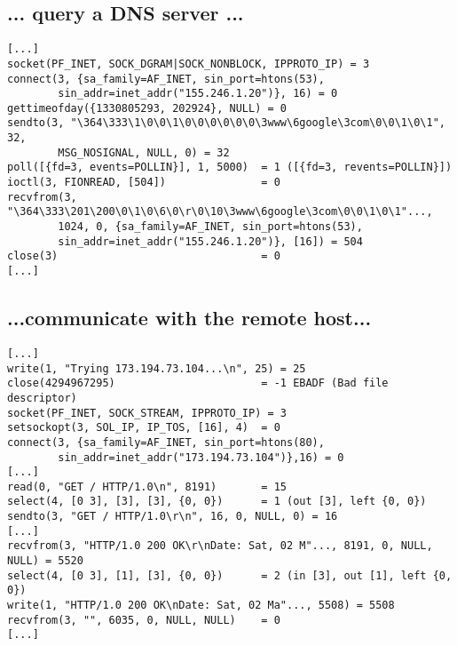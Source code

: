 \documentclass[xga]{xdvislides}
\begin{document}
\subsection{... query a DNS server ...}
\begin{verbatim}
[...]
socket(PF_INET, SOCK_DGRAM|SOCK_NONBLOCK, IPPROTO_IP) = 3
connect(3, {sa_family=AF_INET, sin_port=htons(53),
        sin_addr=inet_addr("155.246.1.20")}, 16) = 0
gettimeofday({1330805293, 202924}, NULL) = 0
sendto(3, "\364\333\1\0\0\1\0\0\0\0\0\0\3www\6google\3com\0\0\1\0\1", 32,
        MSG_NOSIGNAL, NULL, 0) = 32
poll([{fd=3, events=POLLIN}], 1, 5000)  = 1 ([{fd=3, revents=POLLIN}])
ioctl(3, FIONREAD, [504])               = 0
recvfrom(3, "\364\333\201\200\0\1\0\6\0\r\0\10\3www\6google\3com\0\0\1\0\1"...,
        1024, 0, {sa_family=AF_INET, sin_port=htons(53),
        sin_addr=inet_addr("155.246.1.20")}, [16]) = 504
close(3)                                = 0
[...]
\end{verbatim}

\subsection{...communicate with the remote host...}
\begin{verbatim}
[...]
write(1, "Trying 173.194.73.104...\n", 25) = 25
close(4294967295)                       = -1 EBADF (Bad file descriptor)
socket(PF_INET, SOCK_STREAM, IPPROTO_IP) = 3
setsockopt(3, SOL_IP, IP_TOS, [16], 4)  = 0
connect(3, {sa_family=AF_INET, sin_port=htons(80),
        sin_addr=inet_addr("173.194.73.104")},16) = 0
[...]
read(0, "GET / HTTP/1.0\n", 8191)       = 15
select(4, [0 3], [3], [3], {0, 0})      = 1 (out [3], left {0, 0})
sendto(3, "GET / HTTP/1.0\r\n", 16, 0, NULL, 0) = 16
[...]
recvfrom(3, "HTTP/1.0 200 OK\r\nDate: Sat, 02 M"..., 8191, 0, NULL, NULL) = 5520
select(4, [0 3], [1], [3], {0, 0})      = 2 (in [3], out [1], left {0, 0})
write(1, "HTTP/1.0 200 OK\nDate: Sat, 02 Ma"..., 5508) = 5508
recvfrom(3, "", 6035, 0, NULL, NULL)    = 0
[...]
\end{verbatim}
\end{document}

